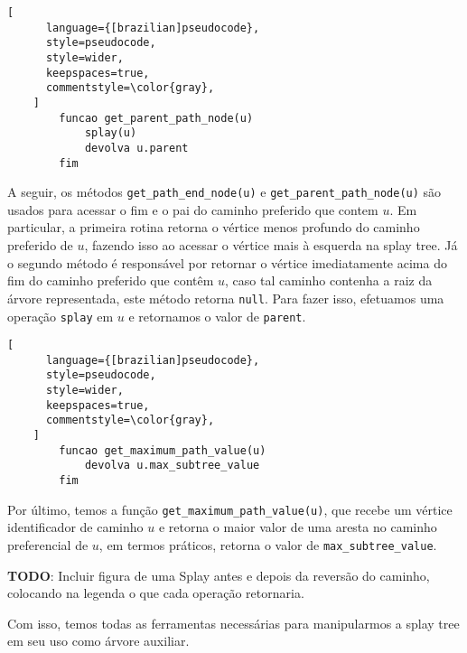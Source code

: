 \begin{programruledcaption}{\label{splay:get-parent-path}}
    \begin{lstlisting}[
      language={[brazilian]pseudocode},
      style=pseudocode,
      style=wider,
      keepspaces=true,
      commentstyle=\color{gray},
    ]
        funcao get_parent_path_node(u)
            splay(u)
            devolva u.parent
        fim
    \end{lstlisting}
\end{programruledcaption}

A seguir, os métodos \texttt{get\_path\_end\_node(u)} e \texttt{get\_parent\_path\_node(u)} são usados para acessar o fim e o pai do caminho preferido que contem $u$. Em particular, a primeira rotina retorna o vértice menos profundo do caminho preferido de $u$, fazendo isso ao acessar o vértice mais à esquerda na splay tree. Já o segundo método é responsável por retornar o vértice imediatamente acima do fim do caminho preferido que contêm $u$, caso tal caminho contenha a raiz da árvore representada, este método retorna \texttt{null}. Para fazer isso, efetuamos uma operação \texttt{splay} em $u$ e retornamos o valor de \texttt{parent}.

\begin{programruledcaption}{\label{splay:get-maximum-value}}
    \begin{lstlisting}[
      language={[brazilian]pseudocode},
      style=pseudocode,
      style=wider,
      keepspaces=true,
      commentstyle=\color{gray},
    ]
        funcao get_maximum_path_value(u)
            devolva u.max_subtree_value
        fim
    \end{lstlisting}
\end{programruledcaption}

Por último, temos a função \texttt{get\_maximum\_path\_value(u)}, que recebe um vértice identificador de caminho $u$ e retorna o maior valor de uma aresta no caminho preferencial de $u$, em termos práticos, retorna o valor de \texttt{max\_subtree\_value}.

\begin{center}
    \textbf{TODO}: Incluir figura de uma Splay antes e depois da reversão do caminho, colocando na legenda o que cada operação retornaria.
\end{center}

Com isso, temos todas as ferramentas necessárias para manipularmos a splay tree em seu uso como árvore auxiliar.